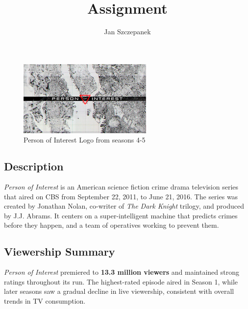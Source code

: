 \documentclass[
  letterpaper,
  DIV=11,
  numbers=noendperiod]{scrartcl}
\title{Assignment}
\author{Jan Szczepanek}
\date{}
\renewcommand*\contentsname{Table of contents}
\newcommand\contentsname{Table of contents}
\begin{document}
\maketitle
\ifdefined\Shaded\renewenvironment{Shaded}{\begin{tcolorbox}[boxrule=0pt, breakable, interior hidden, sharp corners, frame hidden, borderline west={3pt}{0pt}{shadecolor}, enhanced]}{\end{tcolorbox}}\fi

\renewcommand*\contentsname{Table of contents}
{
\hypersetup{linkcolor=}
\setcounter{tocdepth}{3}
\tableofcontents
}
\begin{figure}

{\centering \includegraphics{PoI_files/mediabag/PersonOfInterstLogo.jpg}

}

\caption{Person of Interest Logo from seasons 4-5}

\end{figure}

\hypertarget{description}{%
\subsection{Description}\label{description}}

\emph{Person of Interest} is an American science fiction crime drama
television series that aired on CBS from September 22, 2011, to June 21,
2016. The series was created by Jonathan Nolan, co-writer of \emph{The
Dark Knight} trilogy, and produced by J.J. Abrams. It centers on a
super-intelligent machine that predicts crimes before they happen, and a
team of operatives working to prevent them.

\hypertarget{viewership-summary}{%
\subsection{Viewership Summary}\label{viewership-summary}}

\emph{Person of Interest} premiered to \textbf{13.3 million viewers} and
maintained strong ratings throughout its run. The highest-rated episode
aired in Season 1, while later seasons saw a gradual decline in live
viewership, consistent with overall trends in TV consumption.
\end{document}
